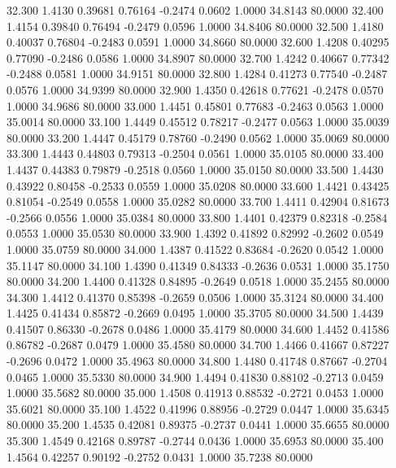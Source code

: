   32.300   1.4130   0.39681   0.76164  -0.2474   0.0602   1.0000  34.8143  80.0000
  32.400   1.4154   0.39840   0.76494  -0.2479   0.0596   1.0000  34.8406  80.0000
  32.500   1.4180   0.40037   0.76804  -0.2483   0.0591   1.0000  34.8660  80.0000
  32.600   1.4208   0.40295   0.77090  -0.2486   0.0586   1.0000  34.8907  80.0000
  32.700   1.4242   0.40667   0.77342  -0.2488   0.0581   1.0000  34.9151  80.0000
  32.800   1.4284   0.41273   0.77540  -0.2487   0.0576   1.0000  34.9399  80.0000
  32.900   1.4350   0.42618   0.77621  -0.2478   0.0570   1.0000  34.9686  80.0000
  33.000   1.4451   0.45801   0.77683  -0.2463   0.0563   1.0000  35.0014  80.0000
  33.100   1.4449   0.45512   0.78217  -0.2477   0.0563   1.0000  35.0039  80.0000
  33.200   1.4447   0.45179   0.78760  -0.2490   0.0562   1.0000  35.0069  80.0000
  33.300   1.4443   0.44803   0.79313  -0.2504   0.0561   1.0000  35.0105  80.0000
  33.400   1.4437   0.44383   0.79879  -0.2518   0.0560   1.0000  35.0150  80.0000
  33.500   1.4430   0.43922   0.80458  -0.2533   0.0559   1.0000  35.0208  80.0000
  33.600   1.4421   0.43425   0.81054  -0.2549   0.0558   1.0000  35.0282  80.0000
  33.700   1.4411   0.42904   0.81673  -0.2566   0.0556   1.0000  35.0384  80.0000
  33.800   1.4401   0.42379   0.82318  -0.2584   0.0553   1.0000  35.0530  80.0000
  33.900   1.4392   0.41892   0.82992  -0.2602   0.0549   1.0000  35.0759  80.0000
  34.000   1.4387   0.41522   0.83684  -0.2620   0.0542   1.0000  35.1147  80.0000
  34.100   1.4390   0.41349   0.84333  -0.2636   0.0531   1.0000  35.1750  80.0000
  34.200   1.4400   0.41328   0.84895  -0.2649   0.0518   1.0000  35.2455  80.0000
  34.300   1.4412   0.41370   0.85398  -0.2659   0.0506   1.0000  35.3124  80.0000
  34.400   1.4425   0.41434   0.85872  -0.2669   0.0495   1.0000  35.3705  80.0000
  34.500   1.4439   0.41507   0.86330  -0.2678   0.0486   1.0000  35.4179  80.0000
  34.600   1.4452   0.41586   0.86782  -0.2687   0.0479   1.0000  35.4580  80.0000
  34.700   1.4466   0.41667   0.87227  -0.2696   0.0472   1.0000  35.4963  80.0000
  34.800   1.4480   0.41748   0.87667  -0.2704   0.0465   1.0000  35.5330  80.0000
  34.900   1.4494   0.41830   0.88102  -0.2713   0.0459   1.0000  35.5682  80.0000
  35.000   1.4508   0.41913   0.88532  -0.2721   0.0453   1.0000  35.6021  80.0000
  35.100   1.4522   0.41996   0.88956  -0.2729   0.0447   1.0000  35.6345  80.0000
  35.200   1.4535   0.42081   0.89375  -0.2737   0.0441   1.0000  35.6655  80.0000
  35.300   1.4549   0.42168   0.89787  -0.2744   0.0436   1.0000  35.6953  80.0000
  35.400   1.4564   0.42257   0.90192  -0.2752   0.0431   1.0000  35.7238  80.0000
